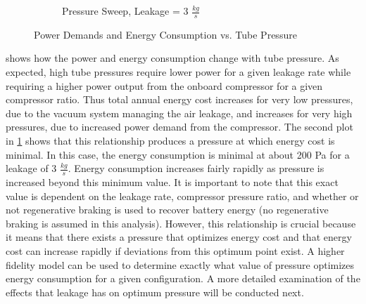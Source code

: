 \begin{figure}
\begin{subfigure}{.5\textwidth}
  \caption{Pressure Sweep, Leakage = 3 $\frac{kg}{s}$}
  \label{fig:pow_demands_vs_tube_press_zoom}
\end{subfigure}
\caption{Power Demands and Energy Consumption vs. Tube Pressure}
\label{fig:pow_demands_vs_tube_press}
\end{figure}
 shows how the power and energy consumption
change with tube pressure. As expected, high tube pressures require lower power
for a given leakage rate while requiring a higher power output from the onboard
compressor for a given compressor ratio. Thus total annual energy cost
increases for very low pressures, due to the vacuum system managing the air
leakage, and increases for very high pressures,
due to increased power demand from the compressor.
The second plot in \cref{fig:pow_demands_vs_tube_press_zoom} shows that this
relationship produces a pressure at which energy cost is minimal. In this case,
the energy consumption is minimal at about 200 Pa for a leakage of 3 $\frac{kg}{s}$.
Energy consumption increases
fairly rapidly as pressure is increased beyond this minimum value. It is
important to note that this exact value is dependent on the leakage rate,
compressor pressure ratio, and whether or not regenerative braking is used to
recover battery energy (no regenerative braking is assumed in this analysis).
However, this relationship is crucial because it means that there exists a
pressure that optimizes energy cost and that energy cost can increase rapidly
if deviations from this optimum point exist. A higher fidelity model can be
used to determine exactly what value of pressure optimizes energy consumption
for a given configuration. A more detailed examination of the effects that
leakage has on optimum pressure will be conducted next.
